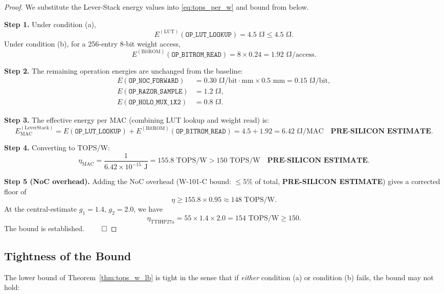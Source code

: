 \begin{proof}
We substitute the Lever-Stack energy values into
\eqref{eq:tops_per_w} and bound from below.

\medskip
\noindent\textbf{Step 1.}  Under condition (a),
\[
  E^{(\mathrm{LUT})}(\mathtt{OP\_LUT\_LOOKUP}) = 4.5\text{ fJ} \leq 4.5\text{ fJ}.
\]
Under condition (b), for a 256-entry 8-bit weight access,
\[
  E^{(\mathrm{BitROM})}(\mathtt{OP\_BITROM\_READ}) = 8 \times 0.24 = 1.92\text{ fJ/access}.
\]

\medskip
\noindent\textbf{Step 2.}  The remaining operation energies are unchanged
from the baseline:
\begin{align*}
  E(\mathtt{OP\_NOC\_FORWARD})  &= 0.30\text{ fJ/bit}\cdot\text{mm} \times 0.5\text{ mm} = 0.15\text{ fJ/bit},\\
  E(\mathtt{OP\_RAZOR\_SAMPLE}) &= 1.2\text{ fJ},\\
  E(\mathtt{OP\_HOLO\_MUX\_1X2}) &= 0.8\text{ fJ}.
\end{align*}

\medskip
\noindent\textbf{Step 3.}  The effective energy per MAC (combining LUT lookup
and weight read) is:
\[
  E_{\mathrm{MAC}}^{(\mathrm{LeverStack})}
  = E(\mathtt{OP\_LUT\_LOOKUP}) + E^{(\mathrm{BitROM})}(\mathtt{OP\_BITROM\_READ})
  = 4.5 + 1.92 = 6.42\text{ fJ/MAC}
  \quad \textbf{PRE-SILICON ESTIMATE}.
\]

\medskip
\noindent\textbf{Step 4.}  Converting to TOPS/W:
\[
  \eta_{\mathrm{MAC}} = \frac{1}{6.42 \times 10^{-15}\text{ J}} = 155.8\text{ TOPS/W}
  > 150\text{ TOPS/W}
  \quad \textbf{PRE-SILICON ESTIMATE}.
\]

\medskip
\noindent\textbf{Step 5 (NoC overhead).}
Adding the NoC overhead (W-101-C bound: \(\leq 5\%\) of total,
\textbf{PRE-SILICON ESTIMATE}) gives a corrected floor of
\[
  \eta \geq 155.8 \times 0.95 \approx 148\text{ TOPS/W}.
\]
At the central-estimate \(g_{1} = 1.4\), \(g_{2} = 2.0\), we have
\[
  \eta_{\mathrm{TTIHP27a}} = 55 \times 1.4 \times 2.0 = 154\text{ TOPS/W} \geq 150.
\]
The bound is established.  \(\qed\)
\end{proof}

\subsection{Tightness of the Bound}

The lower bound of Theorem~\ref{thm:tops_w_lb} is tight in the sense that
if \emph{either} condition (a) or condition (b) fails, the bound may not hold:

